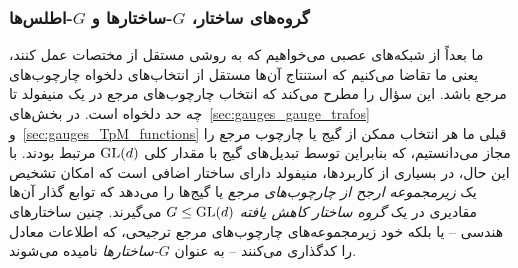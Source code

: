 \subsubsection{گروه‌های ساختار، \textit{$G$}-ساختارها و \textit{$G$}-اطلس‌ها}
\label{sec:local_G-structure_G-atlas}

ما بعداً از شبکه‌های عصبی می‌خواهیم که به روشی مستقل از مختصات عمل کنند، یعنی ما تقاضا می‌کنیم که استنتاج آن‌ها مستقل از انتخاب‌های دلخواه چارچوب‌های مرجع باشد.
این سؤال را مطرح می‌کند که انتخاب چارچوب‌های مرجع در یک منیفولد تا چه حد دلخواه است.
در بخش‌های~\ref{sec:gauges_gauge_trafos} و~\ref{sec:gauges_TpM_functions} قبلی ما هر انتخاب ممکن از گیج یا چارچوب مرجع را مجاز می‌دانستیم، که بنابراین توسط تبدیل‌های گیج با مقدار کلی $\operatorname{GL}(d)$ مرتبط بودند.
با این حال، در بسیاری از کاربردها، منیفولد دارای ساختار اضافی است که امکان تشخیص یک \emph{زیرمجموعه ارجح از چارچوب‌های مرجع} یا گیج‌ها را می‌دهد که توابع گذار آن‌ها مقادیری در یک \emph{گروه ساختار کاهش یافته} $G\leq\operatorname{GL}(d)$ می‌گیرند.
چنین ساختارهای هندسی -- یا بلکه خود زیرمجموعه‌های چارچوب‌های مرجع ترجیحی، که اطلاعات معادل را کدگذاری می‌کنند -- به عنوان \emph{$G$-ساختارها} نامیده می‌شوند.


